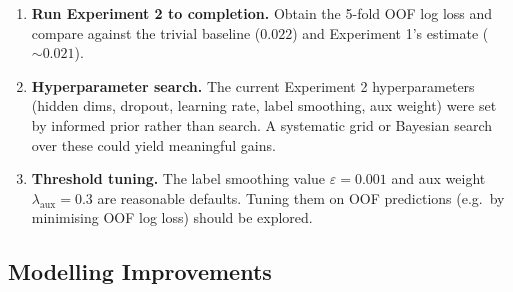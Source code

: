 \documentclass[12pt, a4paper]{article}
\begin{document}
\begin{enumerate}
    \item \textbf{Run Experiment 2 to completion.} Obtain the 5-fold OOF log loss and compare against the trivial baseline ($0.022$) and Experiment 1's estimate ($\sim 0.021$).

    \item \textbf{Hyperparameter search.} The current Experiment 2 hyperparameters (hidden dims, dropout, learning rate, label smoothing, aux weight) were set by informed prior rather than search. A systematic grid or Bayesian search over these could yield meaningful gains.

    \item \textbf{Threshold tuning.} The label smoothing value $\varepsilon = 0.001$ and aux weight $\lambda_{\text{aux}} = 0.3$ are reasonable defaults. Tuning them on OOF predictions (e.g.\ by minimising OOF log loss) should be explored.
\end{enumerate}

\subsection{Modelling Improvements}
\end{document}
